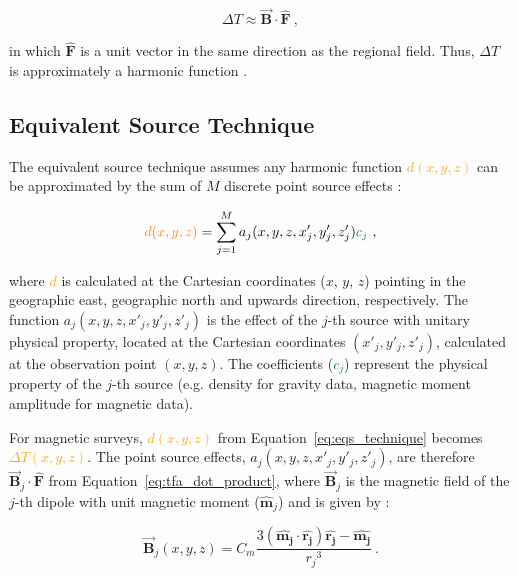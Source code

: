 \begin{equation}
\label{eq:tfa_dot_product}
    \Delta T\approx  \vec{\mathbf{B}} \cdot \hat{\mathbf{F}}
    \ ,
\end{equation}

\noindent
in which $\hat{\mathbf{F}}$ is a unit vector in the same direction as the regional field. Thus, $\Delta T$ is approximately a harmonic function \citep{Blakley1995,OliveiraJr2015}.


\subsection{Equivalent Source Technique}

The equivalent source technique assumes any harmonic function \textcolor{orange}{$d(x, y, z)$} can be approximated by the sum of $M$ discrete point source effects \citep{Dampney1969, Cordell1992}:

\begin{equation}
\label{eq:eqs_technique}
\textcolor{orange}{d (x, y, z)} = \sum_{j=1}^{M} a_j(x, y, z, x'_j, y'_j , z'_j) \textcolor{teal}{c_j}
\ ,
\end{equation}

\noindent
where \textcolor{orange}{$d$} is calculated at the Cartesian coordinates ($x$, $y$, $z$) pointing in the geographic east, geographic north and upwards direction, respectively. The function $a_j(x, y, z, x'_j, y'_j , z'_j)$ is the effect of the $j$-th source with unitary physical property, located at the Cartesian coordinates $(x'_j, y'_j, z'_j)$, calculated at the observation point $(x, y, z)$. The coefficients (\textcolor{teal}{$c_j$}) represent the physical property of the $j$-th source 
(e.g. density for gravity data, magnetic moment amplitude for magnetic data).

For magnetic surveys, \textcolor{orange}{$d (x, y, z)$} from Equation~\ref{eq:eqs_technique} becomes \textcolor{orange}{$\Delta T(x, y, z)$}. The point source effects, $a_j(x, y, z, x'_j, y'_j , z'_j)$, are therefore $\vec{\mathbf{B}}_j \cdot \hat{\mathbf{F}}$ from Equation~\ref{eq:tfa_dot_product}, where $\vec{\mathbf{B}}_j$ is the magnetic field of the $j$-th dipole with unit magnetic moment ($\hat{\mathbf{m}}_j$) and is given by \citep{Blakley1995}:

\begin{equation}
    \vec{\mathbf{B}}_j (x, y, z) = C_m \dfrac{3 \left( \hat{\mathbf{m_j}} \cdot \hat{\mathbf{r_j}} \right) \hat{\mathbf{r_j}} - \hat{\mathbf{m_j}}}{{r_j}^3}
    \ .
    \label{eq:magnetic_field}
\end{equation}

